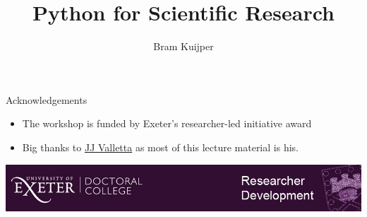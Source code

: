 \documentclass[xcolor=table]{beamer}
\begin{document}
\title{Python for Scientific Research}   
\author{Bram Kuijper}

\frame{\titlepage} 
\begin{frame}{Acknowledgements}
\begin{itemize}\addtolength{\itemsep}{\baselineskip}
	\item The workshop is funded by Exeter's researcher-led initiative award 
	\item Big thanks to \href{https://emps.exeter.ac.uk/mathematics/staff/jjv207}{JJ Valletta} as most of this lecture material is his.
\end{itemize}
\vfill
\includegraphics[width=\textwidth, keepaspectratio]{logo.jpg}

\end{frame}
\end{document}

